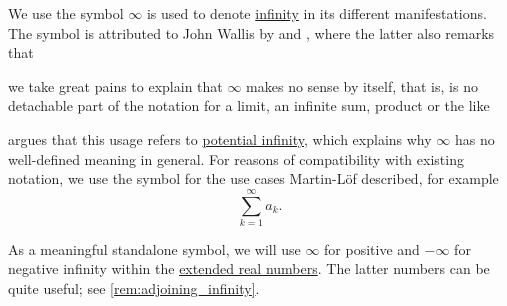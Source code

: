 \begin{remark}\label{rem:lemniscate_symbol}
  We use the  symbol \( \infty \) is used to denote \hyperref[con:transfinitum]{infinity} in its different manifestations. The symbol is attributed to John Wallis by \cite{MartinLöf1990Infinity} and \cite{MacTutor:EarliestUsesOfCalculusSymbols}, where the latter also remarks that
  \begin{displayquote}
    \textellipsis we take great pains to explain that \( \infty \) makes no sense by itself, that is, is no detachable part of the notation for a limit, an infinite sum, product or the like \textellipsis
  \end{displayquote}

  \Textcite[92]{Кантор1985Многообразия} argues that this usage refers to \hyperref[con:transfinitum]{potential infinity}, which explains why \( \infty \) has no well-defined meaning in general. For reasons of compatibility with existing notation, we use the symbol for the use cases Martin-L\"of described, for example
  \begin{equation*}
    \sum_{k=1}^\infty a_k.
  \end{equation*}

  As a meaningful standalone symbol, we will use \( \infty \) for positive and \( -\infty \) for negative infinity within the \hyperref[def:extended_real_numbers]{extended real numbers}. The latter numbers can be quite useful; see \cref{rem:adjoining_infinity}.
\end{remark}

